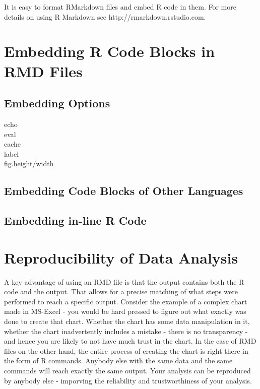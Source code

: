 \documentclass[10pt, letterpaper, twoside]{memoir}\usepackage{knitr}
\begin{document}
It is easy to format RMarkdown files and embed R code in them. For more details on using R Markdown see http://rmarkdown.rstudio.com.

\section{Embedding R Code Blocks in RMD Files}

\subsection{Embedding Options}

\begin{description}
  \item[echo]
  \item[eval]
  \item[cache]
  \item[label]
  \item[fig.height/width]
\end{description}

\subsection{Embedding Code Blocks of Other Languages }


\subsection{Embedding in-line R Code}


\section{Reproducibility of Data Analysis}

A key advantage of using an RMD file is that the output contains both the R code and the output. That allows for a precise matching of what steps were performed to reach a specific output. Consider the example of a complex chart made in MS-Excel - you would be hard pressed to figure out what exactly was done to create that chart. Whether the chart has some data manipulation in it, whether the chart inadvertently includes a mistake - there is no transparency - and hence you are likely to not have much trust in the chart. In the case of RMD files on the other hand, the entire process of creating the chart is right there in the form of R commands. Anybody else with the same data and the same commands will reach exactly the same output. Your analysis can be reproduced by anybody else - imporving the reliability and trustworthiness of your analysis.
\end{document}
